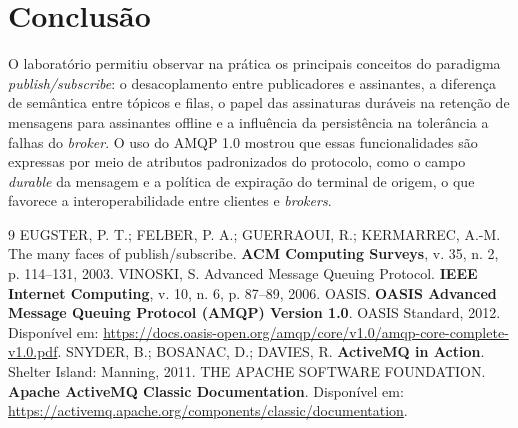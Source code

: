 \documentclass[12pt,a4paper]{article}
\begin{document}
\section{Conclusão}

O laboratório permitiu observar na prática os principais conceitos do paradigma \textit{publish/subscribe}: o desacoplamento entre publicadores e assinantes, a diferença de semântica entre tópicos e filas, o papel das assinaturas duráveis na retenção de mensagens para assinantes offline e a influência da persistência na tolerância a falhas do \textit{broker}. O uso do AMQP 1.0 mostrou que essas funcionalidades são expressas por meio de atributos padronizados do protocolo, como o campo \textit{durable} da mensagem e a política de expiração do terminal de origem, o que favorece a interoperabilidade entre clientes e \textit{brokers}.

\begin{thebibliography}{9}
\setlength{\itemsep}{12pt}
 EUGSTER, P. T.; FELBER, P. A.; GUERRAOUI, R.; KERMARREC, A.-M. The many faces of publish/subscribe. \textbf{ACM Computing Surveys}, v. 35, n. 2, p. 114--131, 2003.
 VINOSKI, S. Advanced Message Queuing Protocol. \textbf{IEEE Internet Computing}, v. 10, n. 6, p. 87--89, 2006.
 OASIS. \textbf{OASIS Advanced Message Queuing Protocol (AMQP) Version 1.0}. OASIS Standard, 2012. Disponível em: \url{https://docs.oasis-open.org/amqp/core/v1.0/amqp-core-complete-v1.0.pdf}.
 SNYDER, B.; BOSANAC, D.; DAVIES, R. \textbf{ActiveMQ in Action}. Shelter Island: Manning, 2011.
 THE APACHE SOFTWARE FOUNDATION. \textbf{Apache ActiveMQ Classic Documentation}. Disponível em: \url{https://activemq.apache.org/components/classic/documentation}.
\end{thebibliography}
\end{document}
